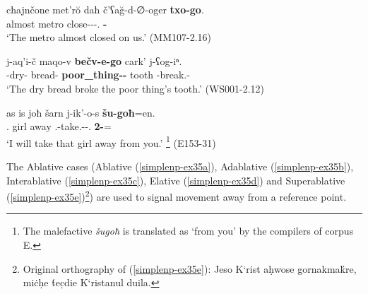 \begin{exe}
	\ex\label{simplenp-ex34}
	\begin{xlist}
		
		
			\ex\label{simplenp-ex34a}
			\gll cħajnčone met'r\u{o} daħ č'ʕa\u{g}-d-∅-oger \textbf{txo-go}. \\
			almost metro {\Pv} close-{\D}-{\Tr}-{\Iam}.{\Imprf} \textbf{{\Fpl}-{\Adess}} \\
			\trans `The metro almost closed on us.'
			\hfill (MM107-2.16)
		
		
		
		
		
			\ex\label{simplenp-ex34b}
			\gll j-aq'i-č maqo-v \textbf{bečv-e-go} cark' j-ʕog-iⁿ. \\
			{\J}-dry-{\Obl} bread-{\Erg} \textbf{poor\_thing-{\Obl}-{\Adess}} tooth {\J}-break.{\Pfv}-{\Aor} \\
			\trans `The dry bread broke the poor thing's tooth.'
			\hfill (WS001-2.12)
		
		
		
			\ex\label{simplenp-ex34c}
			\gll as is joħ šarn j-ik'-o-s \textbf{šu-goħ}=en. \\
			{\Fsg}.{\Erg} {\Med} girl away {\F}.{\Sg}-take.{\Anim}-{\Npst}-{\Fsg}.{\Erg} \textbf{2{\Pl}-{\Adess}}={\Quot} \\
			\trans `I will take that girl away from you.' \footnote{The malefactive \textit{šugoħ} is translated as `from you' by the compilers of corpus E.}
			\hfill (E153-31)
		
		
		
		
	\end{xlist}
\end{exe}



The Ablative cases (Ablative (\ref{simplenp-ex35a}), Adablative (\ref{simplenp-ex35b}), Interablative (\ref{simplenp-ex35c}), Elative (\ref{simplenp-ex35d}) and Superablative (\ref{simplenp-ex35e})\footnote{Original orthography of (\ref{simplenp-ex35e}):  Jeso K`rist aḥwose gornakma\'{k}re, mi\.{c}ḥe \'{t}ec̣die K`ristanul duila.}) are used to signal movement away from a reference point.

